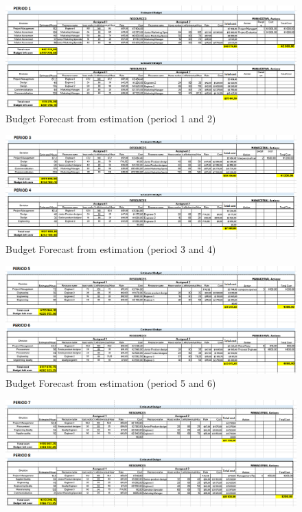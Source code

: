 \begin{appendices}
\begin{landscape}
\begin{figure}[H]
\includegraphics[scale=0.75]{forecast/budget_forecast_est_12.PNG}
\caption{Budget Forecast from estimation (period 1 and 2)}
\end{figure}
\begin{figure}[H]
\includegraphics[scale=0.8]{forecast/budget_forecast_est_34.PNG}
\caption{Budget Forecast from estimation (period 3 and 4)}
\end{figure}
\begin{figure}[H]
\includegraphics[scale=0.8]{forecast/budget_forecast_est_56.PNG}
\caption{Budget Forecast from estimation (period 5 and 6)}
\end{figure}
\begin{figure}[H]
\includegraphics[scale=0.8]{forecast/budget_forecast_est_78.PNG}

\end{figure}
\end{landscape}
\end{appendices}
